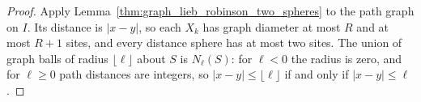 \begin{proof}
    \leanok
    Apply Lemma~\ref{thm:graph_lieb_robinson_two_spheres} to the path graph
    on $I$. Its distance is $|x-y|$, so each $X_k$ has graph diameter at
    most $R$ and at most $R+1$ sites, and every distance sphere has at most
    two sites. The union of graph balls of radius $\lfloor\ell\rfloor$ about
    $S$ is $N_\ell(S)$: for $\ell<0$ the radius is zero, and for $\ell\ge0$
    path distances are integers, so $|x-y|\le\lfloor\ell\rfloor$ if and only
    if $|x-y|\le\ell$.
\end{proof}




